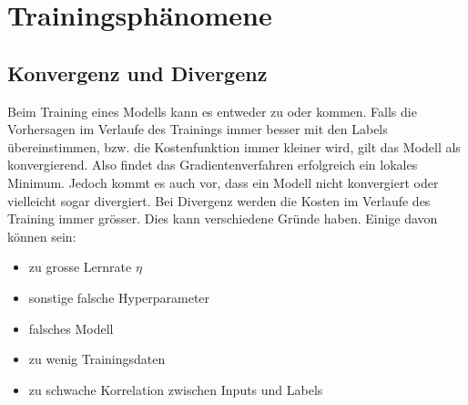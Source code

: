 \section{Trainingsphänomene}

\subsection{Konvergenz und Divergenz}\label{sec:konvergenz}
Beim Training eines Modells kann es entweder zu  oder  kommen.
Falls die Vorhersagen im Verlaufe des Trainings immer besser mit den Labels
übereinstimmen, bzw. die Kostenfunktion immer kleiner wird, gilt das Modell als konvergierend.
Also findet das Gradientenverfahren erfolgreich ein lokales Minimum.
\para{}
Jedoch kommt es auch vor, dass ein Modell nicht konvergiert oder vielleicht
sogar divergiert. Bei Divergenz werden die Kosten im Verlaufe des Training immer
grösser.
Dies kann verschiedene Gründe haben. Einige davon können sein:
\begin{itemize}
\item{zu grosse Lernrate $\eta$}
\item{sonstige falsche Hyperparameter}
\item{falsches Modell}
\item{zu wenig Trainingsdaten}
\item{zu schwache Korrelation zwischen Inputs und Labels}
\end{itemize}


